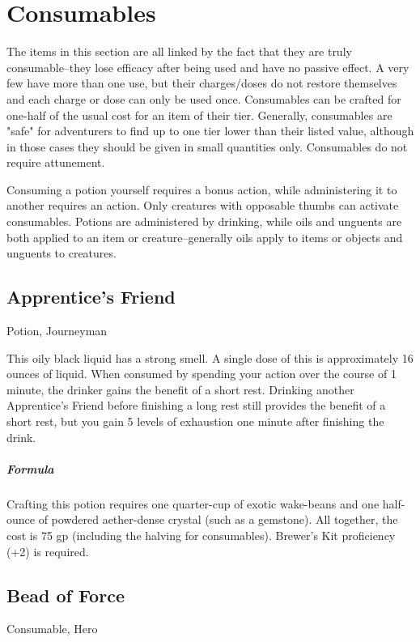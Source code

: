 \section{Consumables}\label{mi:potions-oils-and-scrolls}
The items in this section are all linked by the fact that they are truly consumable--they lose efficacy after being used and have no passive effect. A very few have more than one use, but their charges/doses do not restore themselves and each charge or dose can only be used once. Consumables can be crafted for one-half of the usual cost for an item of their tier. Generally, consumables are "safe" for adventurers to find up to one tier lower than their listed value, although in those cases they should be given in small quantities only. Consumables do not require attunement.

Consuming a potion yourself requires a bonus action, while administering it to another requires an action. Only creatures with opposable thumbs can activate consumables. Potions are administered by drinking, while oils and unguents are both applied to an item or creature--generally oils apply to items or objects and unguents to creatures.

\subsection{Apprentice's Friend}
Potion, Journeyman

This oily black liquid has a strong smell. A single dose of this is approximately 16 ounces of liquid. When consumed by spending your action over the course of 1 minute, the drinker gains the benefit of a short rest. Drinking another Apprentice's Friend before finishing a long rest still provides the benefit of a short rest, but you gain 5 levels of exhaustion one minute after finishing the drink.

\subparagraph*{Formula} Crafting this potion requires one quarter-cup of exotic wake-beans and one half-ounce of powdered aether-dense crystal (such as a gemstone). All together, the cost is 75 gp (including the halving for consumables). Brewer's Kit proficiency (+2) is required.

\subsection{Bead of Force}
Consumable, Hero 

